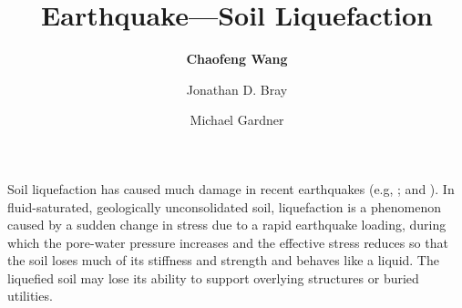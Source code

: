 %
%
%


%
%
%
%
%
%
%
%

\title{Earthquake---Soil Liquefaction}
\author{
    \textbf{Chaofeng Wang} 
    \and Jonathan D. Bray
    \and Michael Gardner}
\tocauthor{}
%
%
\maketitle

Soil liquefaction has caused much damage in recent earthquakes (e.g, \cite{cubrinovski2011geotechnical, cubrinovski2017liquefaction}; and \cite{bray2017new}). In fluid-saturated, geologically unconsolidated soil, liquefaction is a phenomenon caused by a sudden change in stress due to a rapid earthquake loading, during which the pore-water pressure increases and the effective stress reduces so that the soil loses much of its stiffness and strength and behaves like a liquid. The liquefied soil may lose its ability to support overlying structures or buried utilities. 

